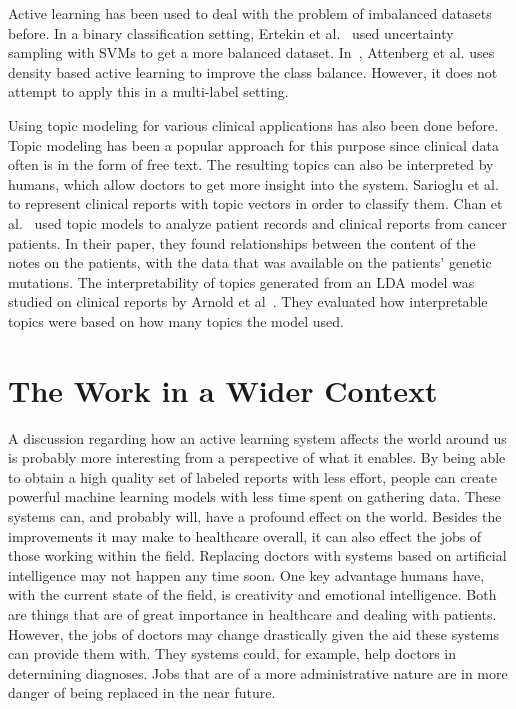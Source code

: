 Active learning has been used to deal with the problem of imbalanced datasets before.
In a binary classification setting, Ertekin et al\@.~\cite{ertekin2007learning} used uncertainty sampling with SVMs to get a more balanced dataset.
In~\cite{attenberg2013class}, Attenberg et al\@. uses density based active learning to improve the class balance.
However, it does not attempt to apply this in a multi-label setting.

Using topic modeling for various clinical applications has also been done before.
Topic modeling has been a popular approach for this purpose since clinical data often is in the form of free text.
The resulting topics can also be interpreted by humans, which allow doctors to get more insight into the system.
Sarioglu et al\@.~\cite{sarioglu2013topic} to represent clinical reports with topic vectors in order to classify them.
Chan et al\@.~\cite{chan2013empirical} used topic models to analyze patient records and clinical reports from cancer patients.
In their paper, they found relationships between the content of the notes on the patients, with the data that was available on the patients' genetic mutations.
The interpretability of topics generated from an LDA model was studied on clinical reports by Arnold et al~\cite{arnold2016evaluating}.
They evaluated how interpretable topics were based on how many topics the model used.


\section{The Work in a Wider Context}

A discussion regarding how an active learning system affects the world around us is probably more interesting from a perspective of what it enables.
By being able to obtain a high quality set of labeled reports with less effort, people can create powerful machine learning models with less time spent on gathering data.
These systems can, and probably will, have a profound effect on the world.
Besides the improvements it may make to healthcare overall, it can also effect the jobs of those working within the field.
Replacing doctors with systems based on artificial intelligence may not happen any time soon.
One key advantage humans have, with the current state of the field, is creativity and emotional intelligence.
Both are things that are of great importance in healthcare and dealing with patients.
However, the jobs of doctors may change drastically given the aid these systems can provide them with.
They systems could, for example, help doctors in determining diagnoses.
Jobs that are of a more administrative nature are in more danger of being replaced in the near future.

